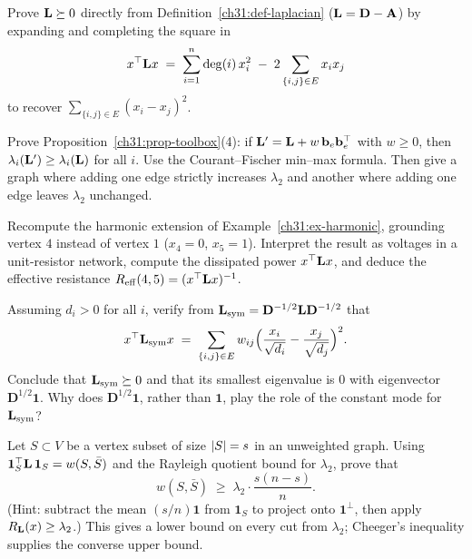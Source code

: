 \begin{exercise}\label{ch31:ex-psd-direct}
Prove $\mathbf{L}\succeq 0$ directly from Definition~\ref{ch31:def-laplacian} ($\mathbf{L} = \mathbf{D}-\mathbf{A}$) by expanding and completing the square in
\[
  x^\top\mathbf{L} x \;=\; \sum_{i=1}^n \deg(i)\,x_i^2 \;-\; 2\sum_{\{i,j\}\in E} x_i x_j
\]
to recover $\sum_{\{i,j\}\in E}(x_i-x_j)^2$.
\end{exercise}

\begin{exercise}\label{ch31:ex-monotone}
Prove Proposition~\ref{ch31:prop-toolbox}(4): if $\mathbf{L}' = \mathbf{L} + w\,\mathbf{b}_e\mathbf{b}_e^\top$ with $w\ge0$, then $\lambda_i(\mathbf{L}')\ge\lambda_i(\mathbf{L})$ for all $i$. Use the Courant--Fischer min--max formula. Then give a graph where adding one edge strictly increases $\lambda_2$ and another where adding one edge leaves $\lambda_2$ unchanged.
\end{exercise}

\begin{exercise}[Harmonic = electrical]\label{ch31:ex-electrical}
Recompute the harmonic extension of Example~\ref{ch31:ex-harmonic}, grounding vertex $4$ instead of vertex $1$ ($x_4=0$, $x_5=1$). Interpret the result as voltages in a unit-resistor network, compute the dissipated power $x^\top\mathbf{L} x$, and deduce the effective resistance $R_{\mathrm{eff}}(4,5) = (x^\top\mathbf{L} x)^{-1}$.
\end{exercise}

\begin{exercise}\label{ch31:ex-normalized}
Assuming $d_i > 0$ for all $i$, verify from $\mathbf{L}_{\mathrm{sym}} = \mathbf{D}^{-1/2}\mathbf{L}\mathbf{D}^{-1/2}$ that
\[
  x^\top\mathbf{L}_{\mathrm{sym}}x \;=\; \sum_{\{i,j\}\in E} w_{ij}\Bigl(\frac{x_i}{\sqrt{d_i}} - \frac{x_j}{\sqrt{d_j}}\Bigr)^2 .
\]
Conclude that $\mathbf{L}_{\mathrm{sym}}\succeq 0$ and that its smallest eigenvalue is $0$ with eigenvector $\mathbf{D}^{1/2}\mathbf{1}$. Why does $\mathbf{D}^{1/2}\mathbf{1}$, rather than $\mathbf{1}$, play the role of the constant mode for $\mathbf{L}_{\mathrm{sym}}$?
\end{exercise}

\begin{exercise}\label{ch31:ex-spectral-cut}
Let $S\subset V$ be a vertex subset of size $\lvert S\rvert=s$ in an unweighted graph. Using $\mathbf{1}_S^\top\mathbf{L}\,\mathbf{1}_S = w(S,\bar S)$ and the Rayleigh quotient bound for $\lambda_2$, prove that
\[
  w(S,\bar S) \;\ge\; \lambda_2 \cdot \frac{s(n-s)}{n} .
\]
(Hint: subtract the mean $(s/n)\mathbf{1}$ from $\mathbf{1}_S$ to project onto $\mathbf{1}^\perp$, then apply $R_{\mathbf{L}}(x) \ge \lambda_2$.) This gives a lower bound on every cut from $\lambda_2$; Cheeger's inequality supplies the converse upper bound.
\end{exercise}

